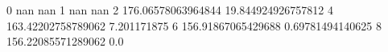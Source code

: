 0 nan nan
1 nan nan
2 176.06578063964844 19.844924926757812
4 163.42202758789062 7.201171875
6 156.91867065429688 0.69781494140625
8 156.22085571289062 0.0
